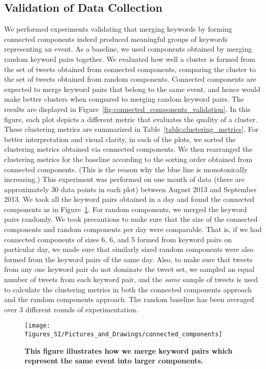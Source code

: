 \subsection{Validation of Data Collection}
We performed experiments validating that merging keywords by forming
connected components indeed produced meaningful groups of keywords
representing an event. As a baseline, we used components obtained by
merging random keyword pairs together. We evaluated how well a cluster
is formed from the set of tweets obtained from connected components,
comparing the cluster to the set of tweets obtained from random
components. Connected components are expected to merge
keyword pairs that belong to the same event, and hence would make
better clusters when compared to merging random keyword pairs. The
results are displayed in
Figure~\ref{fig:connected_components_validation}. In this figure, each
plot depicts a different metric that evaluates the quality of a
cluster. These clustering metrics are summarized in
Table~\ref{table:clustering_metrics}. For better interpretation and
visual clarity, in each of the plots, we sorted the clustering metrics
obtained via connected components. We then rearranged the clustering
metrics for the baseline according to the sorting order obtained from
connected components. (This is the reason why the blue line is
monotonically increasing.) This experiment was performed on one month
of data (there are approximately 30 data points in each plot) between
August 2013 and September 2013. We took all the keyword pairs obtained
in a day and found the connected components as in
Figure~\ref{fig:connected_components}. For random components, we
merged the keyword pairs randomly. We took precautions to make sure
that the size of the connected components and random components per
day were comparable. That is, if we had connected components of sizes
6, 6, and 5 formed from keyword pairs on particular day, we made sure
that similarly sized random components were also formed from the
keyword pairs of the same day. Also, to make sure that tweets from any
one keyword pair do not dominate the tweet set, we sampled an equal
number of tweets from each keyword pair, and the \emph{same} sample of
tweets is used to calculate the clustering metrics in both the connected
components approach and the random components approach. The random
baseline has been averaged over 3 different rounds of experimentation.

\begin{figure}
  \begin{center}
    \texttt{[image: figures\_SI/Pictures\_and\_Drawings/connected\_components]}
    \caption{\textbf{This figure illustrates how we merge keyword
        pairs which represent the same event into larger components.
      }}
    \label{fig:connected_components}
  \end{center}
\end{figure}

